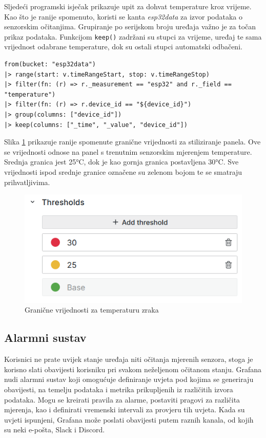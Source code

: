 Sljedeći programski isječak prikazuje upit za dohvat temperature kroz vrijeme. Kao što je ranije spomenuto, koristi se kanta \textit{esp32data} za izvor podataka o senzorskim očitanjima. Grupiranje po serijskom broju uređaja važno je za točan prikaz podataka. Funkcijom \lstinline|keep()| zadržani su stupci za vrijeme, uređaj te sama vrijednost odabrane temperature, dok su ostali stupci automatski odbačeni.

\begin{lstlisting}[caption={Upit za dohvat temperature}, language=flux]
from(bucket: "esp32data")
|> range(start: v.timeRangeStart, stop: v.timeRangeStop)
|> filter(fn: (r) => r._measurement == "esp32" and r._field == "temperature")
|> filter(fn: (r) => r.device_id == "${device_id}")
|> group(columns: ["device_id"])
|> keep(columns: ["_time", "_value", "device_id"])
\end{lstlisting}

Slika \ref{fig:thresholds} prikazuje ranije spomenute granične vrijednosti za stiliziranje panela. Ove se vrijednosti odnose na panel s trenutnim senzorskim mjerenjem temperature. Srednja granica jest 25°C, dok je kao gornja granica postavljena 30°C. Sve vrijednosti ispod srednje granice označene su zelenom bojom te se smatraju prihvatljivima.

\begin{figure}[ht]
	\centering
	\includegraphics[scale=0.7]{imgs/thresholds}
	\caption{Granične vrijednosti za temperaturu zraka}
	\label{fig:thresholds}
\end{figure}

\subsection{Alarmni sustav}

Korisnici ne prate uvijek stanje uređaja niti očitanja mjerenih senzora, stoga je korisno slati obavijesti korisniku pri svakom neželjenom očitanom stanju. Grafana nudi alarmni sustav  koji omogućuje definiranje uvjeta pod kojima se generiraju obavijesti, na temelju podataka i metrika prikupljenih iz različitih izvora podataka. Mogu se kreirati pravila za alarme, postaviti pragovi za različita mjerenja, kao i definirati vremenski intervali za provjeru tih uvjeta. Kada su uvjeti ispunjeni, Grafana može poslati obavijesti putem raznih kanala, od kojih su neki e-pošta, Slack i Discord.  


